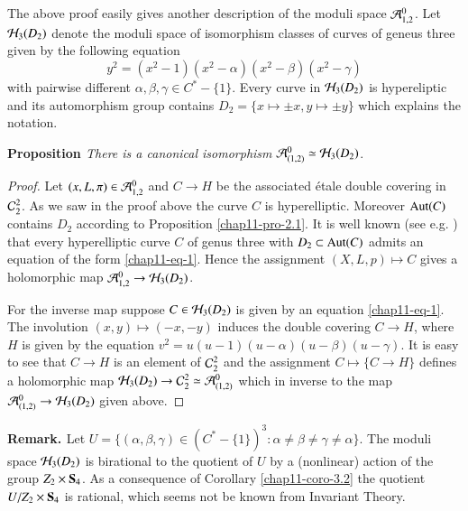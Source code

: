 The above proof easily gives another description of the moduli space $\mathcal{A}_{1,2}^{0}$. Let $\mathcal{H}_{3}(D_{2})$ denote the moduli space of isomorphism classes of curves of geneus three given by the following equation
\begin{equation*}\label{chap11-eq-1}
y^{2} =(x^{2}-1)(x^{2}-\alpha )(x^{2}-\beta)(x^{2}-\gamma)\tag{1}
\end{equation*}
with pairwise different $\alpha, \beta, \gamma \in C^{*}-\{1\}$. Every curve in $\mathcal{H}_{3}(D_{2})$ is hypereliptic and its automorphism group contains $D_{2} = \{x \mapsto \pm x, y \mapsto \pm y\}$ which explains the notation.

\medskip
\noindent
{\bfseries  {} Proposition \label{chap11-prop-3.3}} \textit{There is  a canonical isomorphism}
     $\mathcal{A}_{(1,2)}^{0}\simeq \mathcal{H}_{3}(D_{2})$.

\begin{proof}
Let $(x, L, \pi )\in \mathcal{A}_{1,2}^{0}$ and $ C\rightarrow H$ be the associated \'etale double covering in $\mathcal{C}_{2}^{2}$. As we saw in the proof above the curve $C$ is hyperelliptic. Moreover $\operatorname{Aut}(C)$ contains $D_{2}$ according to Proposition \ref{chap11-pro-2.1}. It is well known (see e.g. \cite{chap11-keyI}) that every hyperelliptic curve $C$ of genus three with $D_{2} \subset \operatorname{Aut}(C)$ admits an equation of the form \eqref{chap11-eq-1}. Hence the assignment $(X,L,p)\mapsto C$ gives a holomorphic map $\mathcal{A}_{1,2}^{0} \rightarrow \mathcal{H}_{3}(D_{2})$.

For the inverse map suppose $C\in \mathcal{H}_{3}(D_{2})$ is given by an equation \eqref{chap11-eq-1}. The involution $(x,y) \mapsto (-x,-y)$ induces the double covering $C\rightarrow H$, where $H$ is given by the equation $v^{2} = u(u-1)(u-\alpha)(u-\beta)(u-\gamma)$. It is easy to see that $C\rightarrow H$ is an element of $\mathcal{C}_{2}^{2}$ and the assignment $C\mapsto \{C\rightarrow H\}$ defines a holomorphic map $\mathcal{H}_{3}(D_{2}) \rightarrow \mathcal{C}_{2}^{2} \simeq \mathcal{A}_{(1,2)}^{0}$ which in inverse to the  map $\mathcal{A}_{(1,2)}^{0} \rightarrow \mathcal{H}_{3}(D_{2})$ given above.
\end{proof}

\medskip
\noindent
{\bfseries  {} Remark. \label{chap11-remark-3.4}} Let $U =\{(\alpha, \beta, \gamma) \in (C^{*}-\{1\})^{3} : \alpha \neq \beta \neq \gamma \neq \alpha\}$. The moduli space $\mathcal{H}_{3}(D_{2})$ is birational to the quotient of $U$ by a (nonlinear) action of the group $Z_{2} \times \mathbf{S}_{4}$. As a consequence of Corollary \ref{chap11-coro-3.2} the quotient
$ U/Z_{2} \times \mathbf{S}_{4}$ is rational, which seems not be known from Invariant Theory.


